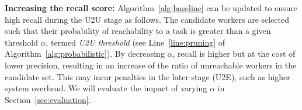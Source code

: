 \documentclass{USC-Thesis}
\numberwithin{equation}{chapter}
\begin{document}
	
\textbf{Increasing the recall score:} Algorithm~\ref{alg:baseline} can be updated to ensure high recall during the U2U stage as follows. The candidate workers are selected such that their probability of reachability to a task is greater than a given threshold $\alpha$, termed \emph{U2U threshold} (see Line~\ref{line:pruning} of Algorithm~\ref{alg:probabilistic}). %
By decreasing $\alpha$, recall is higher but at the cost of lower precision, resulting in an increase of the ratio of unreachable workers in the candidate set. This may incur penalties in the later stage (U2E), such as higher system overhead. We will evaluate the impact of varying $\alpha$ in Section~\ref{sec:evaluation}.
\end{document}
